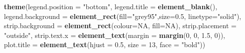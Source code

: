 \documentclass[
]{article}
\newenvironment{Shaded}{\begin{snugshade}}{\end{snugshade}}
\newcommand{\DataTypeTok}[1]{\textcolor[rgb]{0.13,0.29,0.53}{#1}}
\newcommand{\DecValTok}[1]{\textcolor[rgb]{0.00,0.00,0.81}{#1}}
\newcommand{\FloatTok}[1]{\textcolor[rgb]{0.00,0.00,0.81}{#1}}
\newcommand{\KeywordTok}[1]{\textcolor[rgb]{0.13,0.29,0.53}{\textbf{#1}}}
\newcommand{\NormalTok}[1]{#1}
\newcommand{\OtherTok}[1]{\textcolor[rgb]{0.56,0.35,0.01}{#1}}
\newcommand{\StringTok}[1]{\textcolor[rgb]{0.31,0.60,0.02}{#1}}
\begin{document}
\begin{Shaded}
\begin{Highlighting}[]
\StringTok{  }\KeywordTok{theme}\NormalTok{(}\DataTypeTok{legend.position =} \StringTok{"bottom"}\NormalTok{, }\DataTypeTok{legend.title =} \KeywordTok{element\_blank}\NormalTok{(), }\DataTypeTok{legend.background =} \KeywordTok{element\_rect}\NormalTok{(}\DataTypeTok{fill=}\StringTok{"grey95"}\NormalTok{,}\DataTypeTok{size=}\FloatTok{0.5}\NormalTok{, }\DataTypeTok{linetype=}\StringTok{"solid"}\NormalTok{), }\DataTypeTok{strip.background =} \KeywordTok{element\_rect}\NormalTok{(}\DataTypeTok{colour=}\OtherTok{NA}\NormalTok{, }\DataTypeTok{fill=}\OtherTok{NA}\NormalTok{), }\DataTypeTok{strip.placement =} \StringTok{"outside"}\NormalTok{, }\DataTypeTok{strip.text.x =} \KeywordTok{element\_text}\NormalTok{(}\DataTypeTok{margin =} \KeywordTok{margin}\NormalTok{(}\DecValTok{0}\NormalTok{, }\DecValTok{0}\NormalTok{, }\FloatTok{1.5}\NormalTok{, }\DecValTok{0}\NormalTok{)), }\DataTypeTok{plot.title =} \KeywordTok{element\_text}\NormalTok{(}\DataTypeTok{hjust =} \FloatTok{0.5}\NormalTok{, }\DataTypeTok{size =} \DecValTok{13}\NormalTok{, }\DataTypeTok{face =} \StringTok{"bold"}\NormalTok{))}
\end{Highlighting}
\end{Shaded}
\end{document}
